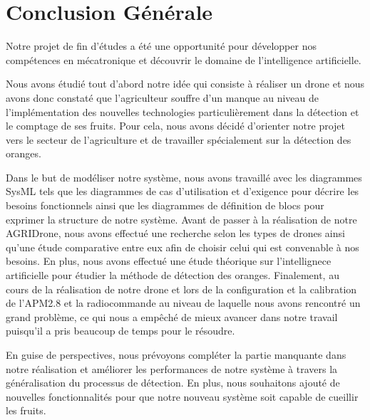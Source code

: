 \chapter{Conclusion Générale }


Notre projet de fin d'études a été une opportunité pour développer nos compétences en mécatronique et découvrir le domaine de l'intelligence artificielle.


Nous avons étudié tout d'abord notre idée qui consiste à réaliser un drone et nous avons donc constaté que l'agriculteur souffre d'un manque au niveau de l'implémentation des nouvelles technologies particulièrement dans la détection et le comptage de ses fruits. Pour cela, nous avons décidé d'orienter notre projet vers le secteur de l'agriculture et de travailler spécialement sur la détection des oranges. 


Dans le but de modéliser notre système, nous avons travaillé avec les diagrammes SysML tels que les diagrammes de cas d'utilisation et d'exigence pour décrire les besoins fonctionnels ainsi que les diagrammes de définition de blocs pour exprimer la structure de notre système. Avant de passer à la réalisation de notre AGRIDrone, nous avons effectué une recherche selon les types de drones ainsi qu'une étude comparative entre eux afin de choisir celui qui est convenable à nos besoins. 
En plus, nous avons effectué une étude théorique sur l'intellignece artificielle pour étudier la méthode de détection des oranges. 
Finalement, au cours de la réalisation de notre drone et lors de la configuration et la calibration de l'APM2.8 et la radiocommande au niveau de laquelle nous avons rencontré un grand problème, ce qui nous a empêché de mieux avancer dans notre travail puisqu'il a pris beaucoup de temps pour le résoudre.

En guise de perspectives, nous prévoyons compléter la partie manquante dans notre réalisation et améliorer les performances de notre système à travers la généralisation du processus de détection. En plus, nous souhaitons ajouté de nouvelles fonctionnalités pour que notre nouveau système soit capable de cueillir les fruits.
